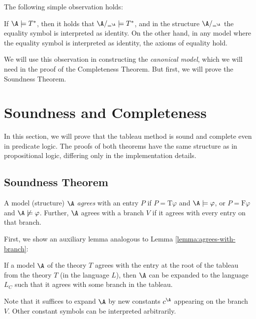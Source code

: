 The following simple observation holds:
\begin{observation}
    If $\A\models T^*$, then it holds that $\A/_{=^\A}\models T^*$, and in the structure $\A/_{=^\A}$ the equality symbol is interpreted as identity. On the other hand, in any model where the equality symbol is interpreted as identity, the axioms of equality hold.
\end{observation}

We will use this observation in constructing the \emph{canonical model}, which we will need in the proof of the Completeness Theorem. But first, we will prove the Soundness Theorem.

\section{Soundness and Completeness}

In this section, we will prove that the tableau method is sound and complete even in predicate logic. The proofs of both theorems have the same structure as in propositional logic, differing only in the implementation details.

\subsection{Soundness Theorem}

A model (structure) $\A$ \emph{agrees} with an entry $P$ if
$P=\mathrm{T}\varphi$ and $\A\models\varphi$, or $P=\mathrm{F}\varphi$ and $\A\not\models\varphi$. Further, $\A$ agrees with a branch $V$ if it agrees with every entry on that branch.

First, we show an auxiliary lemma analogous to Lemma \ref{lemma:agrees-with-branch}:
\begin{lemma}\label{lemma:agrees-with-branch-predicate}
    If a model $\A$ of the theory $T$ agrees with the entry at the root of the tableau from the theory $T$ (in the language $L$), then $\A$ can be expanded to the language $L_C$ such that it agrees with some branch in the tableau.
\end{lemma}
Note that it suffices to expand $\A$ by new constants $c^\A$ appearing on the branch $V$. Other constant symbols can be interpreted arbitrarily.

